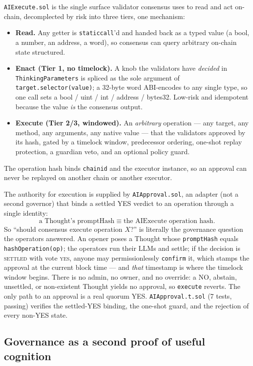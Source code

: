 \documentclass[11pt,a4paper]{article}
\begin{document}
\texttt{AIExecute.sol} is the single surface validator consensus uses to read and act on-chain, decomplected by risk into three tiers, one mechanism:
\begin{itemize}
  \item \textbf{Read.} Any getter is \texttt{staticcall}'d and handed back as a typed value (a bool, a number, an address, a word), so consensus can query arbitrary on-chain state structured.
  \item \textbf{Enact (Tier 1, no timelock).} A knob the validators have \emph{decided} in \texttt{ThinkingParameters} is spliced as the sole argument of \texttt{target.selector(value)}; a 32-byte word ABI-encodes to any single type, so one call sets a bool / uint / int / address / bytes32. Low-risk and idempotent because the value \emph{is} the consensus output.
  \item \textbf{Execute (Tier 2/3, windowed).} An \emph{arbitrary} operation --- any target, any method, any arguments, any native value --- that the validators approved by its hash, gated by a timelock window, predecessor ordering, one-shot replay protection, a guardian veto, and an optional policy guard.
\end{itemize}
The operation hash binds \texttt{chainid} and the executor instance, so an approval can never be replayed on another chain or another executor.

The authority for execution is supplied by \texttt{AIApproval.sol}, an adapter (not a second governor) that binds a settled YES verdict to an operation through a single identity:
\[
  \text{a Thought's promptHash} \;\equiv\; \text{the AIExecute operation hash.}
\]
So ``should consensus execute operation $X$?'' is literally the governance question the operators answered. An opener poses a Thought whose \texttt{promptHash} equals \texttt{hashOperation(op)}; the operators run their LLMs and settle; if the decision is \textsc{settled} with vote \textsc{yes}, anyone may permissionlessly \texttt{confirm} it, which stamps the approval at the current block time --- and \emph{that} timestamp is where the timelock window begins. There is no admin, no owner, and no override: a NO, abstain, unsettled, or non-existent Thought yields no approval, so \texttt{execute} reverts. The only path to an approval is a real quorum YES. \texttt{AIApproval.t.sol} (7 tests, passing) verifies the settled-YES binding, the one-shot guard, and the rejection of every non-YES state.

\subsection{Governance as a second proof of useful cognition}\label{sec:govmint}
\end{document}
